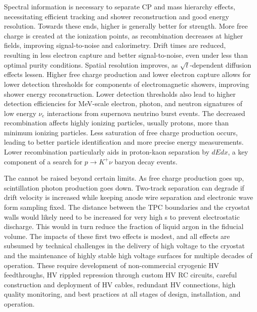Spectral information is necessary to separate CP and mass hierarchy effects, necessitating efficient tracking and shower reconstruction and good energy resolution. Towards these ends, higher is generally better for \efield strength.  More free charge is created at the ionization points, as recombination decreases at higher fields, improving signal-to-noise and calorimetry. Drift times are reduced, resulting in less electron capture and better signal-to-noise, even under less than optimal purity conditions.  Spatial resolution improves, as $\sqrt{t}$-dependent diffusion effects lessen. Higher free charge production and lower electron capture allows for lower detection thresholds for components of electromagnetic showers, improving shower energy reconstruction.  Lower detection thresholds also lead to higher detection efficiencies for MeV-scale electron, photon, and neutron signatures of low energy $\nu_e$ interactions from supernova neutrino burst events.  The decreased recombination affects highly ionizing particles, usually protons, more than minimum ionizing particles.  Less saturation of free charge production occurs,  leading to better particle identification and more precise energy measurements.  Lower recombination particularly aids in proton-kaon separation by $dEdx$, a key component of a search for $p\rightarrow K^+ \nu$ baryon decay events. 

The \efield cannot be raised beyond certain limits.  As free charge production goes up, scintillation photon production goes down.  Two-track separation can degrade if drift velocity is increased while keeping anode wire separation and electronic wave form sampling fixed.  The distance between the TPC boundaries and the cryostat walls would likely need to be increased for very high \efield{}s to prevent electrostatic discharge.  This would in turn reduce the fraction of liquid argon in the fiducial volume.  The impacts of these first two effects is modest, and all effects are subsumed by technical challenges in the delivery of high voltage to the cryostat and the maintenance of highly stable high voltage surfaces for multiple decades of operation.  These require development of non-commercial cryogenic HV feedthroughs, HV rippled repression through custom HV RC circuits, careful construction and deployment of HV cables, redundant HV connections, high quality monitoring, and best practices at all stages of design, installation, and operation.



